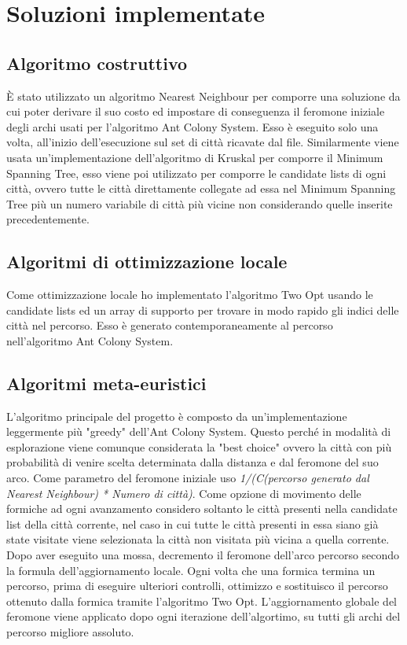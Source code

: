 \chapter*{Soluzioni implementate}
\label{cha_soluzioni}

\section*{Algoritmo costruttivo}
\label{sec_costruttivo}
È stato utilizzato un algoritmo Nearest Neighbour per comporre una soluzione da cui poter derivare
il suo costo ed impostare di conseguenza il feromone iniziale degli archi usati per l'algoritmo 
Ant Colony System.
Esso è eseguito solo una volta, all'inizio dell'esecuzione sul set di città ricavate dal file.
Similarmente viene usata un'implementazione dell'algoritmo di Kruskal per comporre il Minimum Spanning
Tree, esso viene poi utilizzato per comporre le candidate lists di ogni città, ovvero tutte le città direttamente
collegate ad essa nel Minimum Spanning Tree più un numero variabile di città più vicine non considerando quelle 
inserite precedentemente.
\noindent 

\section*{Algoritmi di ottimizzazione locale}
\label{sec_ottimizzazione}
Come ottimizzazione locale ho implementato l'algoritmo Two Opt usando le candidate lists ed un array di
supporto per trovare in modo rapido gli indici delle città nel percorso. Esso è generato contemporaneamente
al percorso nell'algoritmo Ant Colony System.

\section*{Algoritmi meta-euristici}
\label{sec_metaeuristici}
L'algoritmo principale del progetto è composto da un'implementazione leggermente più "greedy" dell'Ant 
Colony System. 
Questo perché in modalità di esplorazione viene comunque considerata la "best choice" ovvero la città
con più probabilità di venire scelta determinata dalla distanza e dal feromone del suo arco.
Come parametro del feromone iniziale uso \textit{1/(C(percorso generato dal Nearest Neighbour) * Numero di città)}.
Come opzione di movimento delle formiche ad ogni avanzamento considero soltanto le città presenti nella candidate list
della città corrente, nel caso in cui tutte le città presenti in essa siano già state
visitate viene selezionata la città non visitata più vicina a quella corrente. Dopo aver eseguito una 
mossa, decremento il feromone dell'arco percorso secondo la formula dell'aggiornamento locale.
Ogni volta che una formica termina un percorso, prima di eseguire ulteriori controlli, ottimizzo e sostituisco
il percorso ottenuto dalla formica tramite l'algoritmo Two Opt. L'aggiornamento globale del feromone viene 
applicato dopo ogni iterazione dell'algortimo, su tutti gli archi del percorso migliore assoluto.

